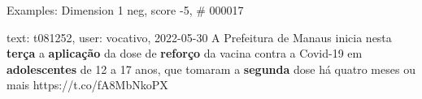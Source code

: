 \begin{frame}{Examples: Dimension 1 neg, score -5, \# 000017}
\footnotesize
\begin{alertblock}{text: t081252, user: vocativo, 2022-05-30}
A Prefeitura de Manaus inicia nesta \textbf{terça} a \textbf{aplicação} da dose 
de \textbf{reforço} da vacina contra a Covid-19 em \textbf{adolescentes} de 12 
a 17 anos, que tomaram a \textbf{segunda} dose há quatro meses ou mais 
https://t.co/fA8MbNkoPX 
\end{alertblock}
\end{frame}
